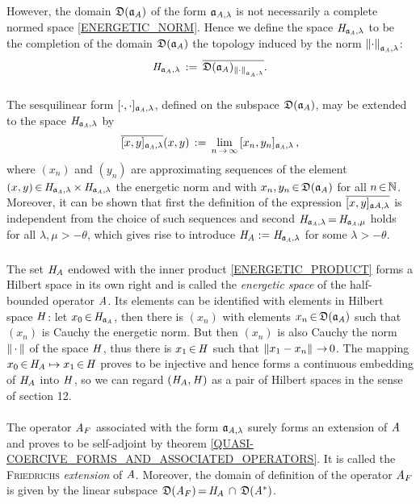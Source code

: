 \documentclass[11pt,twoside]{article}
\begin{document}
\subparagraph*{}
However,
the domain $\mathfrak{D}(\mathfrak{a}_{\mathit{A}})$ of the form $\mathfrak{a}_{\mathit{A},\lambda}$
is not necessarily a complete normed space {\wrt} \eqref{ENERGETIC_NORM}.
Hence we define the space $\mathit{H}_{\mathfrak{a}_{\mathit{A}},\lambda}$ to be the completion
of the domain $\mathfrak{D}(\mathfrak{a}_{\mathit{A}})$ {\wrt} the topology 
induced by the norm $\left\lVert \cdot \right\rVert_{\mathfrak{a}_{\mathit{A}},\lambda}$:
\[
\mathit{H}_{\mathfrak{a}_A,\lambda} \,:=\,
\overline{\mathfrak{D}(\mathfrak{a}_{\mathit{A}})_{\left\lVert \cdot \right\rVert_{\mathfrak{a}_{\mathit{A}},\lambda}}}.
\]

\subparagraph*{}
The sesquilinear form $[\cdot,\cdot]_{\mathfrak{a}_{\mathit{A}},\lambda}$,
defined on the subspace $\mathfrak{D}(\mathfrak{a}_A)$,
may be extended to the space $\mathit{H}_{\mathfrak{a}_{\mathit{A}},\lambda}$ by
\begin{equation}\label{ENERGETIC_PRODUCT}
\overline{[x,y]_{\mathfrak{a}_{\mathit{A}},\lambda} }(x,y)
\,:=\,
\lim_{n {\,\to\,} \infty} \, [x_n,y_n]_{\mathfrak{a}_{\mathit{A}},\lambda}\,,
\end{equation}
where $(x_n)$ and $(y_n)$ are approximating sequences of
the element
$(x,y) {\,\in\,} \mathit{H}_{\mathfrak{a}_{\mathit{A}},\lambda} {\,\times\,} \mathit{H}_{\mathfrak{a}_{\mathit{A}},\lambda}$
{\wrt} the energetic norm
and with $x_n, y_n {\,\in\,} \mathfrak{D}(\mathfrak{a}_{\mathit{A}})$ for all $n {\,\in\,} {\mathbb{N}}$.
Moreover,
it can be shown
that first the definition of the expression $\overline{[x,y]_{\mathfrak{a}{\mathit{A}},\lambda}}$
is independent from the choice of such sequences
and second $\mathit{H}_{\mathfrak{a}_{\mathit{A}},\lambda} {\,=\,} \mathit{H}_{\mathfrak{a}_{\mathit{A}},\mu}$ holds
for all $\lambda, \mu > -\theta$,
which gives rise to introduce
$\mathit{H}_{\mathit{A}} := \mathit{H}_{\mathfrak{a}_{\mathit{A}},\lambda}$ for some $\lambda > -\theta$.

\subparagraph*{}
The set $\mathit{H}_{\mathit{A}}$ endowed with the inner product \eqref{ENERGETIC_PRODUCT}
forms a Hilbert space in its own right and
is called the \textit{energetic space} of the half-bounded operator $\mathit{A}$.
Its elements can be identified with elements in Hilbert space $\mathit{H}$:
let $x_0 {\,\in\,} \mathit{H}_{\mathfrak{a}_{\mathit{A}}}$,
then there is $(x_n)$ with elements $x_n {\,\in\,} \mathfrak{D}(\mathfrak{a}_{\mathit{A}})$ such that
$(x_n)$ is Cauchy {\wrt} the energetic norm.
But then $(x_n)$ is also Cauchy {\wrt} the norm $\left\lVert \,\cdot\, \right\rVert$
of the space $\mathit{H}$,
thus there is $x_1 {\,\in\,} \mathit{H}$ such that $\left\lVert x_1-x_n \right\rVert {\,\to\,} 0$.
The mapping $x_0 {\,\in\,} \mathit{H}_{\mathit{A}} \mapsto x_1 {\,\in\,} \mathit{H}$ proves to be injective
and hence forms a continuous embedding of $\mathit{H}_A$ into $\mathit{H}$,
so we can regard $(\mathit{H}_A,\mathit{H})$ as a pair of Hilbert spaces
in the sense of section 12.

\paragraph*{}
The operator $\mathit{A}_F$
associated with the form $\mathfrak{a}_{\mathit{A},\lambda}$
surely forms an extension of $\mathit{A}$ and proves to be self-adjoint
by theorem \ref{QUASI-COERCIVE_FORMS_AND_ASSOCIATED_OPERATORS}.
It is called the \textsc{Friedrichs} \textit{extension} of $\mathit{A}$.
Moreover,
the domain of definition of the operator $\mathit{A}_F$
is given by the linear subspace
$\mathfrak{D}(\mathit{A}_F) {\,=\,} \mathit{H}_A \, \cap \, \mathfrak{D}(\mathit{A}^*)$.
\end{document}
